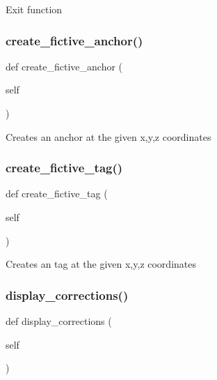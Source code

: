 \begin{DoxyVerb}Exit function\end{DoxyVerb}
 \mbox{\label{class_menu_1_1_menu_a6a933e1b66dd2707e798efa5dbe724a7}} 
\subsubsection{\texorpdfstring{create\+\_\+fictive\+\_\+anchor()}{create\_fictive\_anchor()}}
{\footnotesize\ttfamily def create\+\_\+fictive\+\_\+anchor (\begin{DoxyParamCaption}\item[{}]{self }\end{DoxyParamCaption})}

\begin{DoxyVerb}Creates an anchor at the given x,y,z coordinates\end{DoxyVerb}
 \mbox{\label{class_menu_1_1_menu_a47a07cce1b4c80a7d3c0a41045015f69}} 
\subsubsection{\texorpdfstring{create\+\_\+fictive\+\_\+tag()}{create\_fictive\_tag()}}
{\footnotesize\ttfamily def create\+\_\+fictive\+\_\+tag (\begin{DoxyParamCaption}\item[{}]{self }\end{DoxyParamCaption})}

\begin{DoxyVerb}Creates an tag at the given x,y,z coordinates\end{DoxyVerb}
 \mbox{\label{class_menu_1_1_menu_a32babc5b86a4f39290d2d4a10ef0ec5c}} 
\subsubsection{\texorpdfstring{display\+\_\+corrections()}{display\_corrections()}}
{\footnotesize\ttfamily def display\+\_\+corrections (\begin{DoxyParamCaption}\item[{}]{self }\end{DoxyParamCaption})}

